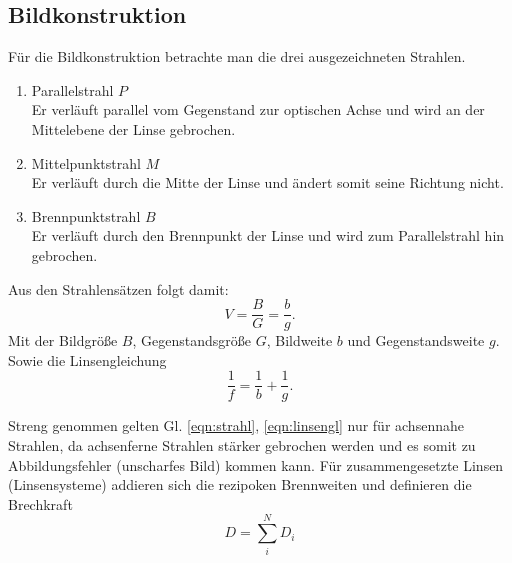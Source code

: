 \subsection{Bildkonstruktion}
Für die Bildkonstruktion betrachte man die drei ausgezeichneten Strahlen.
\begin{enumerate}
    \item Parallelstrahl $P$\\
    Er verläuft parallel vom Gegenstand zur optischen Achse und wird an der Mittelebene der Linse gebrochen.
    \item Mittelpunktstrahl $M$\\
    Er verläuft durch die Mitte der Linse und ändert somit seine Richtung nicht.
    \item Brennpunktstrahl $B$\\
    Er verläuft durch den Brennpunkt der Linse und wird zum Parallelstrahl hin gebrochen.
\end{enumerate}
Aus den Strahlensätzen folgt damit:
\begin{equation}
    V=\frac{B}{G}=\frac{b}{g}.
    \label{eqn:strahl}
\end{equation}
Mit der Bildgröße $B$, Gegenstandsgröße $G$, Bildweite $b$ und Gegenstandsweite $g$.
Sowie die Linsengleichung
\begin{equation}
    \frac{1}{f}=\frac{1}{b}+\frac{1}{g}.
    \label{eqn:linsengl}
\end{equation}

Streng genommen gelten Gl. \ref{eqn:strahl}, \ref{eqn:linsengl} nur für achsennahe Strahlen, da achsenferne Strahlen
stärker gebrochen werden und es somit zu Abbildungsfehler (unscharfes Bild) kommen kann.
Für zusammengesetzte Linsen (Linsensysteme) addieren sich die rezipoken Brennweiten und definieren die Brechkraft
\begin{equation}
    D=\sum_i^N D_i
\end{equation}
\label{sec:Theorie}
